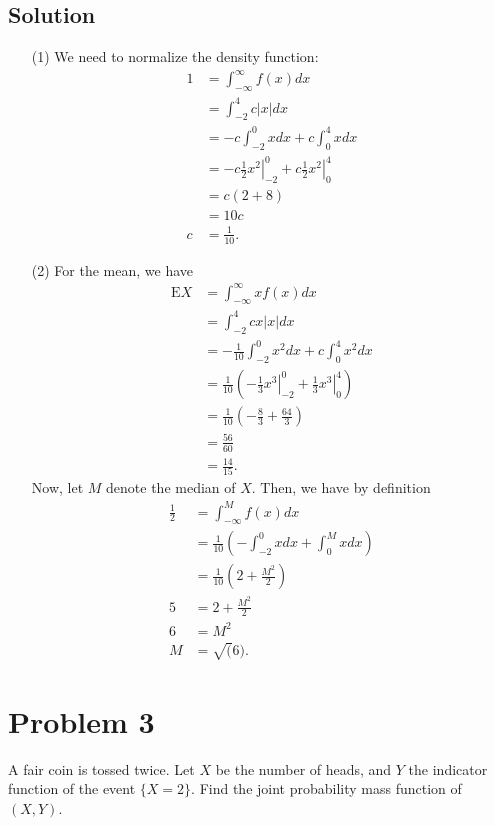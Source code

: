 \documentclass[10pt,a4paper]{article}
\theoremstyle{theorem}
\theoremstyle{definition}
\begin{document}
\subsection*{Solution}
\begin{enumerate}
\item[(1)] We need to normalize the density function:
\begin{align*}
1 &= \int_{- \infty}^{\infty} f(x)dx\\
&= \int_{-2}^4 c |x| dx\\
&= -c \int_{-2}^0 x dx + c \int_{0}^{4} x dx\\
&= \left. -c \frac{1}{2} x^2 \right|_{-2}^0 + \left. c \frac{1}{2} x^2 \right|_{0}^4\\
&= c(2 + 8)\\
&= 10c\\
c &= \frac{1}{10}.
\end{align*}

\item[(2)] For the mean, we have
\begin{align*}
\text{E}X &= \int_{-\infty}^{\infty} x f(x) dx\\
&= \int_{-2}^4 c x |x| dx\\
&= -\frac{1}{10} \int_{-2}^0 x^2 dx + c \int_{0}^{4} x^2 dx\\
&= \frac{1}{10} \left( \left.  - \frac{1}{3} x^3 \right|_{-2}^0 + \left.  \frac{1}{3} x^3 \right|_{0}^4 \right)\\
&= \frac{1}{10} \left( -\frac{8}{3} + \frac{64}{3} \right)\\
&= \frac{56}{60}\\
&= \frac{14}{15}.
\end{align*}
Now, let $M$ denote the median of $X$. Then, we have by definition 
\begin{align*}
\frac{1}{2} &= \int_{- \infty}^{M} f(x)dx\\
&= \frac{1}{10} \left(- \int_{-2}^{0} x dx + \int_{0}^{M} x dx \right) \\
&= \frac{1}{10} \left( 2 + \frac{M^2}{2} \right)\\
5 &= 2 + \frac{M^2}{2}\\
6 &= M^2\\
M &= \sqrt(6).
\end{align*}
\end{enumerate}

\section*{Problem 3}
A fair coin is tossed twice. Let $X$ be the number of heads, and $Y$ the indicator function of the event $\{X = 2\}$. Find the joint probability mass function of $(X, Y)$.
\end{document}
